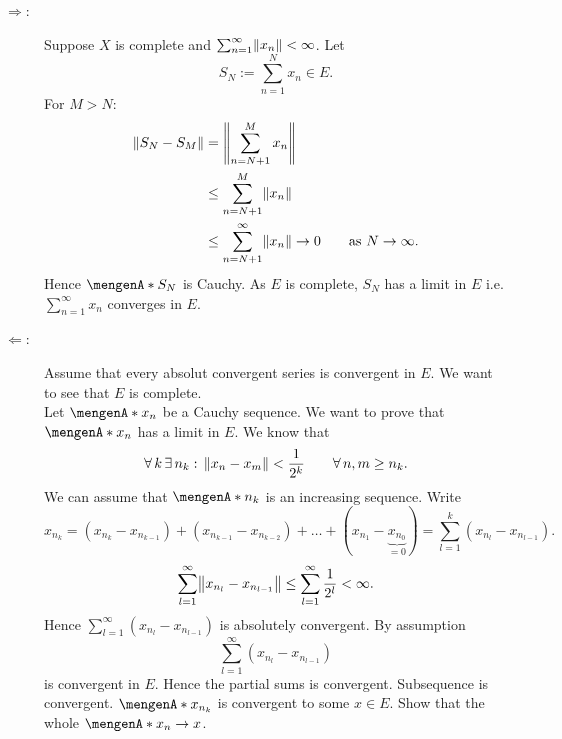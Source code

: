 \begin{beweis}
	\begin{description}
		\item[$\Rightarrow$:] Suppose $X$ is complete and $\sum_{n=1}^{\infty}\norm{x_n} < \infty$. Let 
		\[
			S_N := \sum_{n=1}^{N}x_n \in E.
		\] 
		For $M >N$:
		\begin{align*}
			\norm{S_N-S_M} &= \norm{\sum_{n=N+1}^{M}x_n} \\
			&\leq \sum_{n=N+1}^{M} \norm{x_n} \\
			&\leq \sum_{n=N+1}^{\infty} \norm{x_n} \to 0 \qquad \text{as }N \to \infty.
		\end{align*}
		Hence $\set{S_N}$ is Cauchy. As $E$ is complete, $S_N$ has a limit in $E$ i.e. $\sum_{n=1}^{\infty}x_n$ converges in $E$.
		\item[$\Leftarrow$:] Assume that every absolut convergent series is convergent in $E$. We want to see that $E$ is complete. \\
		Let $\set{x_n}$ be a Cauchy sequence. We want to prove that $\set{x_n}$ has a limit in $E$. We know that
		\[
			\forall\, k \,\exists\,n_k: \, \norm{x_n-x_m}< \frac{1}{2^k} \qquad \forall\, n,m \geq n_k.
		\]
		We can assume that $\set{n_k}$ is an increasing sequence. Write
		\[
			x_{n_k} = (x_{n_k}-x_{n_{k-1}})+ (x_{n_{k-1}}-x_{n_{k-2}}) + \dots +(x_{n_1}-\underset{=0}{\underbrace{x_{n_0}}}) = \sum_{l=1}^{k}(x_{n_l}-x_{n_{l-1}}).
		\]
		\[
			\sum_{l=1}^{\infty}\norm{x_{n_l}-x_{n_{l-1}}} \leq \sum_{l=1}^{\infty}\frac{1}{2^l} < \infty.
		\]
		Hence $\sum_{l=1}^{\infty}(x_{n_l}-x_{n_{l-1}})$ is absolutely convergent. By assumption 
		\[
			\sum_{l=1}^{\infty}(x_{n_l}-x_{n_{l-1}}) 
		\]
		is convergent in $E$. Hence the partial sums is convergent. Subsequence is convergent. $\set{x_{n_k}}$ is convergent to some $x \in E$.
		 Show that the whole $\set{x_n} \to x$.
	\end{description}
\end{beweis}